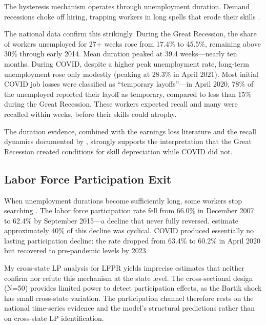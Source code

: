\documentclass[12pt]{article}
\begin{document}
The hysteresis mechanism operates through unemployment duration. Demand recessions choke off hiring, trapping workers in long spells that erode their skills \citep{blanchard1986hysteresis, pissarides1992loss}.

The national data confirm this strikingly. During the Great Recession, the share of workers unemployed for 27+ weeks rose from 17.4\% to 45.5\%, remaining above 30\% through early 2014. Mean duration peaked at 39.4 weeks---nearly ten months. During COVID, despite a higher peak unemployment rate, long-term unemployment rose only modestly (peaking at 28.3\% in April 2021). Most initial COVID job losses were classified as ``temporary layoffs''---in April 2020, 78\% of the unemployed reported their layoff as temporary, compared to less than 15\% during the Great Recession. These workers expected recall and many were recalled within weeks, before their skills could atrophy.

The duration evidence, combined with the earnings loss literature \citep{jacobson1993earnings, davis2010recessions, jarosch2023searching, schmieder2016effects} and the recall dynamics documented by \citet{fujita2017recall}, strongly supports the interpretation that the Great Recession created conditions for skill depreciation while COVID did not.

\subsection{Labor Force Participation Exit}

When unemployment durations become sufficiently long, some workers stop searching \citep{kroft2016long}. The labor force participation rate fell from 66.0\% in December 2007 to 62.4\% by September 2015---a decline that never fully reversed. \citet{coibion2017innocent} estimate approximately 40\% of this decline was cyclical. COVID produced essentially no lasting participation decline: the rate dropped from 63.4\% to 60.2\% in April 2020 but recovered to pre-pandemic levels by 2023.

My cross-state LP analysis for LFPR yields imprecise estimates that neither confirm nor refute this mechanism at the state level. The cross-sectional design (N=50) provides limited power to detect participation effects, as the Bartik shock has small cross-state variation. The participation channel therefore rests on the national time-series evidence and the model's structural predictions rather than on cross-state LP identification.
\end{document}
